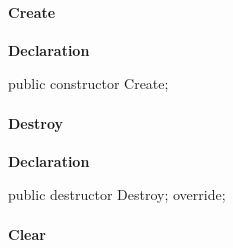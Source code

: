 \documentclass{report}
\newif\ifpdf
\begin{document}
\paragraph*{Create}\hspace*{\fill}

\label{httpsend.THTTPSend-Create}
\begin{list}{}{
\setlength{\itemindent}{0cm}
\setlength{\listparindent}{0cm}
\setlength{\leftmargin}{\evensidemargin}
\addtolength{\leftmargin}{\tmplength}
\settowidth{\labelsep}{X}
\addtolength{\leftmargin}{\labelsep}
\setlength{\labelwidth}{\tmplength}
}
\item[\textbf{Declaration}\hfill]
\ifpdf
\begin{flushleft}
\fi
\begin{ttfamily}
public constructor Create;\end{ttfamily}

\ifpdf
\end{flushleft}
\fi

\end{list}
\paragraph*{Destroy}\hspace*{\fill}

\label{httpsend.THTTPSend-Destroy}
\begin{list}{}{
\setlength{\itemindent}{0cm}
\setlength{\listparindent}{0cm}
\setlength{\leftmargin}{\evensidemargin}
\addtolength{\leftmargin}{\tmplength}
\settowidth{\labelsep}{X}
\addtolength{\leftmargin}{\labelsep}
\setlength{\labelwidth}{\tmplength}
}
\item[\textbf{Declaration}\hfill]
\ifpdf
\begin{flushleft}
\fi
\begin{ttfamily}
public destructor Destroy; override;\end{ttfamily}

\ifpdf
\end{flushleft}
\fi

\end{list}
\paragraph*{Clear}\hspace*{\fill}
\end{document}
